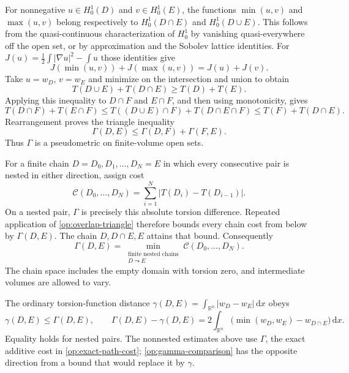 \documentclass[11pt,reqno]{amsart}
\numberwithin{equation}{section}
\newcommand{\R}{\mathbb R}
\newcommand{\dd}{\,\mathrm d}
\newcommand{\abs}[1]{\lvert#1\rvert}
\begin{document}
For nonnegative $u\in H_0^1(D)$ and $v\in H_0^1(E)$, the functions
$\min(u,v)$ and $\max(u,v)$ belong respectively to
$H_0^1(D\cap E)$ and $H_0^1(D\cup E)$.
This follows from the quasi-continuous characterization of
$H_0^1$ by vanishing quasi-everywhere off the open set, or by
approximation and the Sobolev lattice identities.
For $J(u)=\frac12\int\abs{\nabla u}^2-\int u$ those identities give
\[
 J(\min(u,v))+J(\max(u,v))=J(u)+J(v).
\]
Take $u=w_D$, $v=w_E$ and minimize on the intersection and union
to obtain
\begin{equation}\label{op:supermodular}
 T(D\cup E)+T(D\cap E)\ge T(D)+T(E).
\end{equation}
Applying this inequality to $D\cap F$ and $E\cap F$, and then
using monotonicity, gives
\[
 T(D\cap F)+T(E\cap F)
 \le T((D\cup E)\cap F)+T(D\cap E\cap F)
 \le T(F)+T(D\cap E).
\]
Rearrangement proves the triangle inequality
\begin{equation}\label{op:overlap-triangle}
 \Gamma(D,E)\le\Gamma(D,F)+\Gamma(F,E).
\end{equation}
Thus $\Gamma$ is a pseudometric on finite-volume open sets.

For a finite chain $D=D_0,D_1,\ldots,D_N=E$ in which every
consecutive pair is nested in either direction, assign cost
\[
 \mathcal C(D_0,\ldots,D_N)
     =\sum_{i=1}^N\abs{T(D_i)-T(D_{i-1})}.
\]
On a nested pair, $\Gamma$ is precisely this absolute torsion
difference.  Repeated application of \eqref{op:overlap-triangle}
therefore bounds every chain cost from below by $\Gamma(D,E)$.
The chain $D,D\cap E,E$ attains that bound.  Consequently
\begin{equation}\label{op:exact-path-cost}
 \boxed{\quad
 \Gamma(D,E)=\min_{\substack{\text{finite nested chains}\\D\leadsto E}}
          \mathcal C(D_0,\ldots,D_N).
 \quad}
\end{equation}
The chain space includes the empty domain with torsion zero, and
intermediate volumes are allowed to vary.

The ordinary torsion-function distance
$\gamma(D,E)=\int_{\R^n}\abs{w_D-w_E}\dd x$ obeys
\begin{equation}\label{op:gamma-comparison}
 \gamma(D,E)\le\Gamma(D,E),\qquad
 \Gamma(D,E)-\gamma(D,E)
   =2\int_{\R^n}\bigl(\min(w_D,w_E)-w_{D\cap E}\bigr)\dd x.
\end{equation}
Equality holds for nested pairs.  The nonnested estimates above
use $\Gamma$, the exact additive cost in
\eqref{op:exact-path-cost}; \eqref{op:gamma-comparison} has the
opposite direction from a bound that would replace it by $\gamma$.
\end{document}
